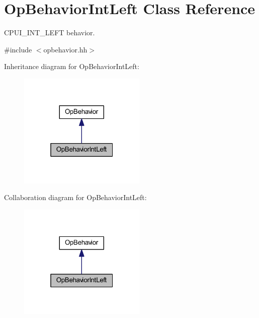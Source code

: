 \hypertarget{class_op_behavior_int_left}{}\section{Op\+Behavior\+Int\+Left Class Reference}
\label{class_op_behavior_int_left}


C\+P\+U\+I\+\_\+\+I\+N\+T\+\_\+\+L\+E\+FT behavior.  




{\ttfamily \#include $<$opbehavior.\+hh$>$}



Inheritance diagram for Op\+Behavior\+Int\+Left\+:
\nopagebreak
\begin{figure}[H]
\begin{center}
\leavevmode
\includegraphics[width=172pt]{class_op_behavior_int_left__inherit__graph}
\end{center}
\end{figure}


Collaboration diagram for Op\+Behavior\+Int\+Left\+:
\nopagebreak
\begin{figure}[H]
\begin{center}
\leavevmode
\includegraphics[width=172pt]{class_op_behavior_int_left__coll__graph}
\end{center}
\end{figure}
